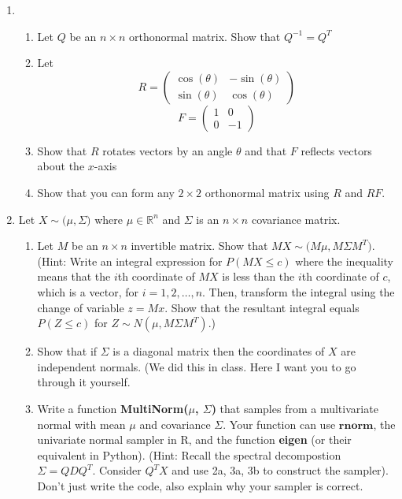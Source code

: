 \documentclass{article}
\begin{document}
\begin{enumerate}
\item 
\begin{enumerate}
\item Let $Q$ be an $n \times n$ orthonormal matrix.  Show that $Q^{-1} = Q^T$
\item Let 
\begin{equation}
R = \left(
\begin{array}{cc}
\cos(\theta) & -\sin(\theta) \\
\sin(\theta) & \cos(\theta)
\end{array}
\right)
\end{equation}
\begin{equation}
F = \left(
\begin{array}{cc}
1 &0  \\
0 & -1
\end{array}
\right)
\end{equation}
\item Show that $R$ rotates vectors by an angle $\theta$ and that $F$ reflects vectors about the $x$-axis
\item Show that you can form any $2 \times 2$ orthonormal matrix using $R$ and $RF$.
\end{enumerate}



\item Let $X \sim \mathcal(\mu, \Sigma)$ where $\mu \in \mathbb{R}^n$ and $\Sigma$ is an $n \times n$ covariance matrix.  
\begin{enumerate}
\item Let $M$ be an $n \times n$ invertible matrix.  Show that $MX \sim \mathcal(M\mu, M \Sigma M^T)$.   (Hint:  Write an integral expression for $P(MX \le c)$ where the inequality means that the $i$th coordinate of $MX$ is less than the $i$th coordinate of $c$, which is a vector, for $i=1,2,\dots,n$.   Then, transform the integral using the change of variable $z = Mx$.  Show that the resultant integral equals $P(Z \le c)$ for $Z \sim N(\mu, M \Sigma M^T)$.)
\item Show that if $\Sigma$ is a diagonal matrix then the coordinates of $X$ are independent normals.  (We did this in class.  Here I want you to go through it yourself.
\item Write a function \textbf{MultiNorm($\mu$, $\Sigma$)} that samples from a multivariate normal with mean $\mu$ and covariance $\Sigma$.  Your function can use $\textbf{rnorm}$, the univariate normal sampler in R, and the function \textbf{eigen} (or their equivalent in Python).  (Hint:  Recall the spectral decompostion $\Sigma = QDQ^T$. Consider $Q^TX$ and use 2a, 3a, 3b to construct the sampler).  Don't just write the code, also explain why your sampler is correct.
\end{enumerate}

\end{enumerate}
\end{document}
